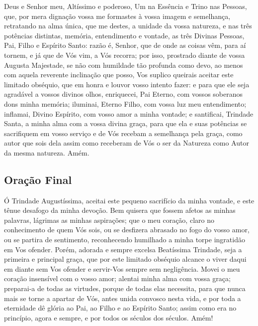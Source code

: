 \documentclass[18pt]{article}
\begin{document}
\begin{justify}
Deus e Senhor meu, Altíssimo e poderoso, Um na Essência e Trino nas Pessoas, que, por mera dignação vossa me formastes à vossa imagem e semelhança, retratando na alma única, que me destes, a unidade da vossa natureza, e nas três potências distintas, memória, entendimento e vontade, as três Divinas Pessoas, Pai, Filho e Espírito Santo: razão é, Senhor, que de onde as coisas vêm, para aí tornem, e já que de Vós vim, a Vós recorra; por isso, prostrado diante de vossa Augusta Majestade, se não com humildade tão profunda como devo, ao menos com aquela reverente inclinação que posso, Vos suplico queirais aceitar este limitado obséquio, que em honra e louvor vosso intento fazer: e para que ele seja agradável a vossos divinos olhos, enriquecei, Pai Eterno, com vossos soberanos dons minha memória; iluminai, Eterno Filho, com vossa luz meu entendimento; inflamai, Divino Espírito, com vosso amor a minha vontade; e santificai, Trindade Santa, a minha alma com a vossa divina graça, para que ela e suas potências se sacrifiquem em vosso serviço e de Vós recebam a semelhança pela graça, como autor que sois dela assim como receberam de Vós o ser da Natureza como Autor da mesma natureza. Amém.

\subsection{Oração Final} \label{sec:OraçãoFinal}

Ó Trindade Augustíssima, aceitai este pequeno sacrifício da minha vontade, e este tênue desafogo da minha devoção. Bem quisera que fossem afetos as minhas palavras, lágrimas as minhas aspirações; que o meu coração, claro no conhecimento de quem Vós sois, ou se desfizera abrasado no fogo do vosso amor, ou se partira de sentimento, reconhecendo humilhado a minha torpe ingratidão em Vos ofender. Porém, adorada e sempre excelsa Beatíssima Trindade, seja a primeira e principal graça, que por este limitado obséquio alcance o viver daqui em diante sem Vos ofender e servir-Vos sempre sem negligência. Movei o meu coração insensível com o vosso amor; alentai minha alma com vossa graça; preparai-a de todas as virtudes, porque de todas elas necessita, para que nunca mais se torne a apartar de Vós, antes unida convosco nesta vida, e por toda a eternidade dê glória ao Pai, ao Filho e ao Espírito Santo; assim como era no princípio, agora e sempre, e por todos os séculos dos séculos. Amém!

\vfill

\end{justify}
\end{document}
